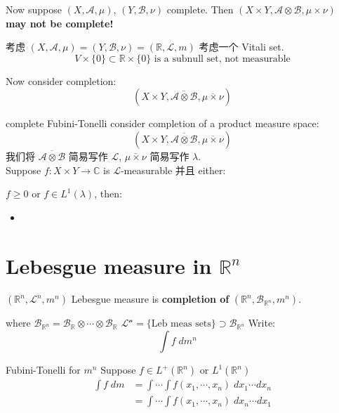 \documentclass[lang=cn,11pt]{elegantbook}
\begin{document}
Now suppose \((X, \mathcal{A}, \mu)\), $ (Y , \mathcal{B}, \nu)$ complete. Then \((X\times Y , \mathcal{A} \otimes \mathcal{B} , \mu\times \nu  )\) \textbf{may not be complete!}

\begin{example}
      考虑 $(X, \mathcal{A}, \mu) = (Y , \mathcal{B}, \nu) = (\mathbb{R}, \mathcal{L}, m)$
       考虑一个 Vitali set. \[
       V \times \{0\} \subset \mathbb{R} \times \{0\} \text{ is a subnull set, not measurable}
       \]
\end{example}



Now consider completion: \[
(X \times Y , \overline{\mathcal{A} \otimes \mathcal{B}},  \overline{\mu \times \nu}   ) 
\]



\begin{theorem}{complete Fubini-Tonelli}
 consider completion of a product measure space: \[
(X \times Y , \overline{\mathcal{A} \otimes \mathcal{B}},  \overline{\mu \times \nu}   ) 
\]
我们将 $\overline{\mathcal{A} \otimes \mathcal{B}}$ 简易写作 $\mathcal{L}$, $\overline{\mu \times \nu}   $ 简易写作 $\lambda$.\\
Suppose $f: X \times Y \to \mathbb{C}$ is $\mathcal{L}$-measurable 并且 either: 

$f \geq 0$ or $f \in L^1(\lambda)$, then: 
\begin{itemize}
    \item 
\end{itemize}

    
\end{theorem}



\section{Lebesgue measure in $\mathbb{R}^n$}

\begin{definition}
    $(\mathbb{R}^n, \mathcal{L}^n, m^n)$ Lebesgue measure is \textbf{completion of } $(\mathbb{R}^n, \mathcal{B}_{\mathbb{R}^n}, m^n)$. 
\end{definition}
where $ \mathcal{B}_{\mathbb{R}^n} =  \mathcal{B}_{\mathbb{R}} \otimes \cdots \otimes \mathcal{B}_{\mathbb{R}}  $
\(\mathcal{L^n }  = \{ \text{Leb meas sets} \}  \supset  \mathcal{B}_{\mathbb{R}^n}\)
Write: \[  \int f \;d m^n   \quad 
\]


\begin{theorem}{Fubini-Tonelli for $m^n$}
    Suppose $f \in L^+(\mathbb{R}^n)$ or $L^1(\mathbb{R}^n)$
\begin{align}
\int f \; dm &= \int \cdots \int f(x_1, \cdots, x_n) 
\; dx_1 \cdots dx_n        \\
& = \int \cdots \int f(x_1, \cdots, x_n) 
\; dx_n \cdots dx_1
\end{align}
\end{theorem}
\end{document}
